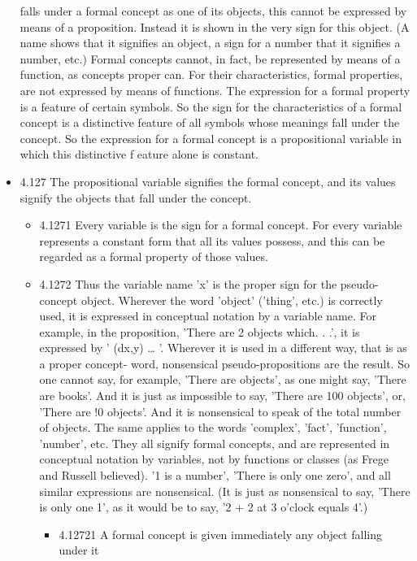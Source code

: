 \documentclass[11pt]{article}
\begin{document}
\begin{itemize}
falls under a formal concept as one of its objects, this cannot be
expressed by means of a proposition. Instead it is shown in the very sign
for this object. (A name shows that it signifies an object, a sign for a
number that it signifies a number, etc.) Formal concepts cannot, in fact,
be represented by means of a function, as concepts proper can. For their
characteristics, formal properties, are not expressed by means of
functions. The expression for a formal property is a feature of certain
symbols. So the sign for the characteristics of a formal concept is a
distinctive feature of all symbols whose meanings fall under the concept.
So the expression for a formal concept is a propositional variable in which
this distinctive f
eature alone is constant.
\item 4.127
\label{sec:org2ba3028}
The propositional variable signifies the formal concept, and its
values signify the objects that fall under the concept.
\begin{itemize}
\item 4.1271
\label{sec:orge4338dd}
Every variable is the sign for a formal concept. For every variable
represents a constant form that all its values possess, and this can be
regarded as a formal property of those values.
\item 4.1272
\label{sec:org636775f}
Thus the variable name 'x' is the proper sign for the pseudo-concept
object. Wherever the word 'object' ('thing', etc.) is correctly used, it is
expressed in conceptual notation by a variable name. For example, in the
proposition, 'There are 2 objects which. . .', it is expressed by ' (dx,y)
\ldots{} '. Wherever it is used in a different way, that is as a proper concept-
word, nonsensical pseudo-propositions are the result. So one cannot say,
for example, 'There are objects', as one might say, 'There are books'. And
it is just as impossible to say, 'There are 100 objects', or, 'There are !0
objects'. And it is nonsensical to speak of the total number of objects.
The same applies to the words 'complex', 'fact', 'function', 'number', etc.
They all signify formal concepts, and are represented in conceptual
notation by variables, not by functions or classes (as Frege and Russell
believed). '1 is a number', 'There is only one zero', and all similar
expressions are nonsensical. (It is just as nonsensical to say, 'There is
only one 1', as it would be to say, '2 + 2 at 3 o'clock equals 4'.)
\begin{itemize}
\item 4.12721
\label{sec:org3823265}
A formal concept is given immediately any object falling under it

\end{itemize}
\end{itemize}
\end{itemize}
\end{document}
